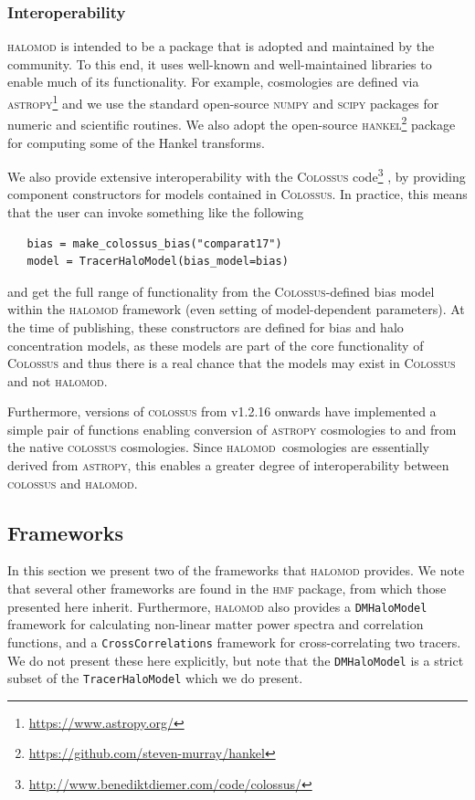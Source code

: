 \documentclass[5p]{elsarticle}
\newcommand{\halomod}{\textsc{halomod}}
\begin{document}
\subsubsection{Interoperability}
\textsc{halomod} is intended to be a package that is adopted and maintained by the community. To this end, it uses well-known and well-maintained libraries to enable much of its functionality. 
For example, cosmologies are defined via \textsc{astropy}\footnote{\url{https://www.astropy.org/}} and we use the standard open-source \textsc{numpy} and \textsc{scipy} packages for numeric and scientific routines. 
We also adopt the open-source \textsc{hankel}\footnote{\url{https://github.com/steven-murray/hankel}} \citep{Murray2019} package for computing some of the Hankel transforms.

We also provide extensive interoperability with the \textsc{Colossus} code\footnote{\url{http://www.benediktdiemer.com/code/colossus/}} \citep{Diemer2018}, by providing component constructors for models contained in \textsc{Colossus}. 
In practice, this means that the user can invoke something like the following
\begin{lstlisting}
   bias = make_colossus_bias("comparat17")
   model = TracerHaloModel(bias_model=bias)
\end{lstlisting}
and get the full range of functionality from the \textsc{Colossus}-defined bias model within the \textsc{halomod} framework (even setting of model-dependent parameters).
At the time of publishing, these constructors are defined for bias and halo concentration models, as these models are part of the core functionality of \textsc{Colossus} and thus there is a real chance that the models may exist in \textsc{Colossus} and not \textsc{halomod}. 

Furthermore, versions of \textsc{colossus} from v1.2.16 onwards have implemented a simple pair of functions enabling conversion of \textsc{astropy} cosmologies to and from the native \textsc{colossus} cosmologies. 
Since \halomod\ cosmologies are essentially derived from \textsc{astropy}, this enables a greater degree of interoperability between \textsc{colossus}
 and \halomod.
 
\subsection{Frameworks}
\label{sec:halomod:frameworks}
In this section we present two of the frameworks that \textsc{halomod} provides. We note that several other frameworks are found in the \textsc{hmf} package, from which those presented here inherit. Furthermore, \textsc{halomod} also provides a \verb|DMHaloModel| framework for calculating non-linear matter power spectra and correlation functions, and a \verb|CrossCorrelations| framework for cross-correlating two tracers. We do not present these here explicitly, but note that the \verb|DMHaloModel| is a strict subset of the \verb|TracerHaloModel| which we do present.
\end{document}
